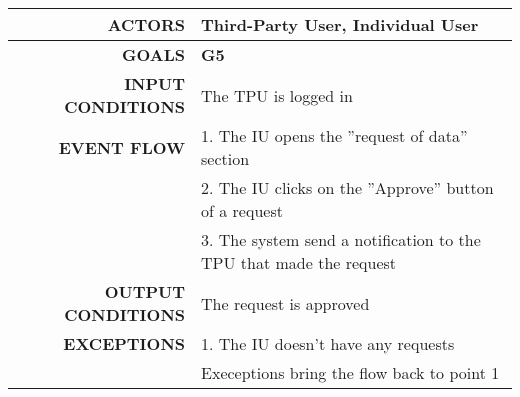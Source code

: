 \begin{table}[h!]
\begin{tabular}{|r|p{3in}|}
\hline
\textbf{ACTORS} & Third-Party User, Individual User\\
\hline
\textbf{GOALS} & \textbf{G5}\\
\hline
\textbf{INPUT CONDITIONS} & The TPU is logged in\\
\hline
\textbf{EVENT FLOW} 
&1. The IU opens the ''request of data'' section \\
&2. The IU clicks on the ''Approve'' button of a request \\
&3. The system send a notification to the TPU that made the request \\
\hline
\textbf{OUTPUT CONDITIONS} & The request is approved \\
\hline
\textbf{EXCEPTIONS} 
&1. The IU doesn't have any requests \\
&Execeptions bring the flow back to point 1 \\
\hline
\end{tabular}
\end{table}